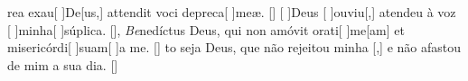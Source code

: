 {  %
  {rea exau[ ]{De}[us,] attendit voci depreca[ ]{me}æ. [\LinkLA]}%
    {[ ]{Deus} [ ]{ou}{viu}[,] atendeu à voz [ ]{mi}{nha}[ ]{súpli}ca. [\LinkPT]},
  {\textit{Be}{ne}díctus Deus, qui non amóvit orati[ ]{me}[am] et misericórdi[ ]{su}{am}[ ]{a} me. [\LinkLA]}%
    {to seja Deus, que não rejeitou minha [,] e não afastou de mim a sua dia. [\LinkPT]}
}